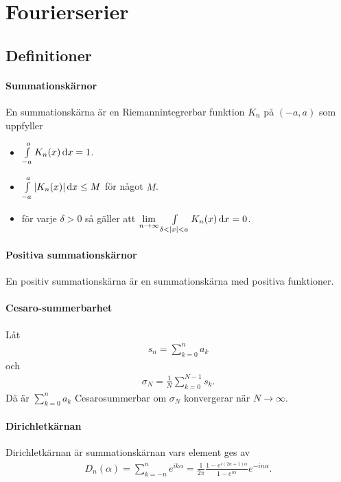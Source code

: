 \section{Fourierserier}

\subsection{Definitioner}

\paragraph{Summationskärnor}
En summationskärna är en Riemannintegrerbar funktion $K_{n}$ på $(-a, a)$ som uppfyller
\begin{itemize}
	\item $\int\limits_{-a}^{a}K_{n}(x)\dd{x} = 1$.
	\item $\int\limits_{-a}^{a}\abs{K_{n}(x)}\dd{x} \leq M$ för något $M$.
	\item för varje $\delta > 0$ så gäller att $\lim\limits_{n\to\infty}\int\limits_{\delta < \abs{x} < a}^{}K_{n}(x)\dd{x} = 0$.
\end{itemize}

\paragraph{Positiva summationskärnor}
En positiv summationskärna är en summationskärna med positiva funktioner.

\paragraph{Cesaro-summerbarhet}
Låt
\begin{align*}
	s_{n} = \sum\limits_{k = 0}^{n}a_{k}
\end{align*}
och
\begin{align*}
	\sigma_{N} = \frac{1}{N}\sum\limits_{k = 0}^{N - 1}s_{k}.
\end{align*}
Då är $\sum\limits_{k = 0}^{n}a_{k}$ Cesarosummerbar om $\sigma_{N}$ konvergerar när $N\to\infty$.

\paragraph{Dirichletkärnan}
Dirichletkärnan är summationskärnan vars element ges av
\begin{align*}
	D_{n}(\alpha) = \sum\limits_{k = -n}^{n}e^{ik\alpha} = \frac{1}{2\pi}\frac{1 - e^{i(2n + 1)\alpha}}{1 - e^{i\alpha}}e^{-in\alpha}.
\end{align*}

